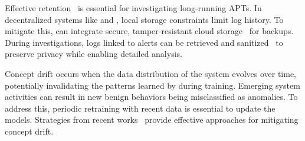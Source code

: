  Effective retention~\cite{wilbert2012log,rapsheet2020} is essential for investigating long-running APTs. In decentralized systems like \Sys and \disdet, local storage constraints limit log history. To mitigate this, \Sys can integrate secure, tamper-resistant cloud storage~\cite{kumar2018secure,hardlog} for backups. During investigations, logs linked to alerts can be retrieved and sanitized~\cite{portillo2019towards} to preserve privacy while enabling detailed analysis.



 Concept drift occurs when the data distribution of the system evolves over time, potentially invalidating the patterns learned by \Sys during training. Emerging system activities can result in new benign behaviors being misclassified as anomalies. To address this, periodic retraining with recent data is essential to update the models. Strategies from recent works~\cite{lu2018learning, barbero2022transcending,jordaney2017transcend} provide effective approaches for mitigating concept drift.


